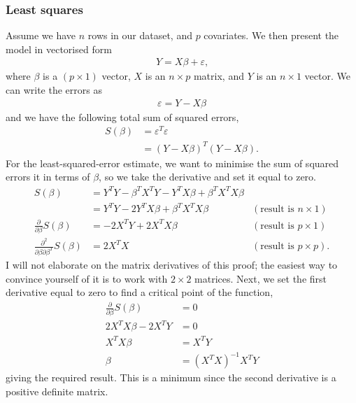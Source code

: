 \documentclass[a4paper]{article}
\begin{document}
\subsubsection{Least squares}
Assume we have $n$ rows in our dataset, and $p$ covariates.
We then present the model in vectorised form
\begin{align*}
Y = X \beta + \varepsilon
\text{,}
\end{align*}
where $\beta$ is a $(p \times 1)$ vector,
$X$ is an $n \times p$ matrix, and
$Y$ is an $n \times 1$ vector.
We can write the errors as
\begin{align*}
\varepsilon = Y-X \beta
\end{align*}
and we have the following total sum of squared errors,
\begin{align*}
S(\beta) &= \varepsilon^T \varepsilon \\
&= (Y-X\beta)^T (Y-X\beta)
\text{.}
\end{align*}
For the least-squared-error estimate, we want to minimise the sum of squared errors it in terms of $\beta$, so we take the derivative and set it equal to zero.
\begin{align*}
  S(\beta)
  &= Y^T Y -\beta^T X^T Y - Y^T X \beta + \beta^T X^T X \beta \\
  &= Y^T Y - 2 Y^T X \beta + \beta^T X^T X \beta
  & (\text{result is }n \times 1)
  \\
 \frac{\partial}{\partial\beta} S(\beta)
 &= - 2 X^T Y +
    2X^T X \beta
    & (\text{result is }p \times 1)
    \\
 \frac{\partial^2}{\partial\beta \partial\beta^T} S(\beta)
 &= 2
    X^T
    X
    & (\text{result is }p \times p)
    \text{.}
\end{align*}
I will not elaborate on the matrix derivatives of this proof; the easiest way to convince yourself of it is to work with $2 \times 2$ matrices.
Next, we set the first derivative equal to zero to find a critical point of the function,
\begin{align*}
 \frac{\partial}{\partial\beta} S(\beta) &= 0 \\
  2X^T X \beta - 2 X^T Y &= 0 \\
  X^T X \beta &=  X^T Y  \\
   \beta &= (X^T X)^{-1} X^T Y
\end{align*}
giving the required result.
This is a minimum since the second derivative is a positive definite matrix.
\end{document}

